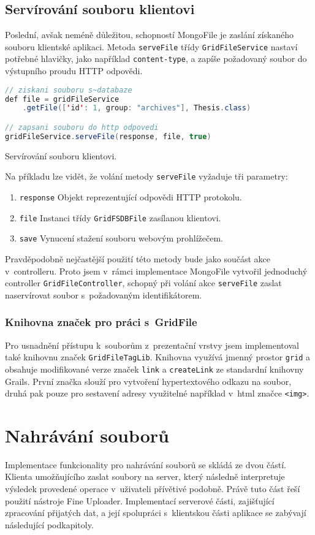 \subsection{Servírování souboru klientovi}
Poslední, avšak neméně důležitou, schopností MongoFile je zaslání získaného souboru klientské aplikaci. Metoda \texttt{serveFile} třídy \texttt{GridFileService} nastaví potřebné hlavičky, jako například \texttt{content-type}, a zapíše požadovaný soubor do výstupního proudu HTTP odpovědi.
\begin{example}
    \centering
    \begin{lstlisting}[language=Java]
// ziskani souboru s~databaze
def file = gridFileService
    .getFile(['id': 1, group: "archives"], Thesis.class)

// zapsani souboru do http odpovedi
gridFileService.serveFile(response, file, true)
    \end{lstlisting}
    \caption{Servírování souboru klientovi.}
\end{example}
Na příkladu lze vidět, že volání metody \texttt{serveFile} vyžaduje tři parametry:
\begin{enumerate}
\item \texttt{response} Objekt reprezentující odpovědi HTTP protokolu.
\item \texttt{file} Instanci třídy \texttt{GridFSDBFile} zasílanou klientovi.
\item \texttt{save} Vynucení stažení souboru webovým prohlížečem.
\end{enumerate}
Pravděpodobně nejčastější použití této metody bude jako součást akce v~controlleru. Proto jsem v~rámci implementace MongoFile vytvořil jednoduchý controller \texttt{GridFileController}, schopný při volání akce \texttt{serveFile} zaslat naservírovat soubor s~požadovaným identifikátorem.

\subsubsection{\textbf{Knihovna značek pro práci s~GridFile}}
Pro usnadnění přístupu k~souborům z~prezentační vrstvy jsem implementoval také knihovnu značek \texttt{GridFileTagLib}. Knihovna využívá jmenný prostor \texttt{grid} a obsahuje modifikované verze značek \texttt{link} a \texttt{createLink} ze standardní knihovny Grails. První značka slouží pro vytvoření hypertextového odkazu na soubor, druhá pak pouze pro sestavení adresy využitelné například v~html značce \texttt{<img>}.

\section{Nahrávání souborů}
Implementace funkcionality pro nahrávání souborů se skládá ze dvou částí. Klienta umožňujícího zaslat soubory na server, který následně interpretuje výsledek provedené operace v~uživateli přívětivé podobně. Právě tuto část řeší použití nástroje Fine Uploader. Implementací serverové části, zajišťující zpracování přijatých dat, a její spolupráci s~klientskou části aplikace se zabývají následující podkapitoly.

